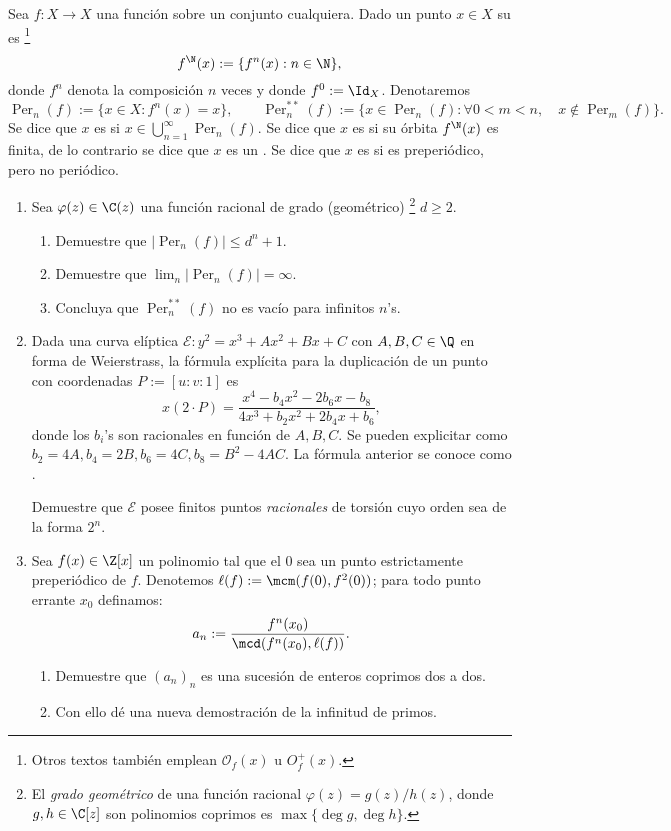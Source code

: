 \documentclass[11pt, reqno]{amsart}
\DeclareMathOperator{\Per}{Per}
\begin{document}
\begin{mydef}
	Sea $f \colon X \to X$ una función sobre un conjunto cualquiera.
	Dado un punto $x \in X$ su  es%
	\footnote{Otros textos también emplean $\mathcal{O}_f(x)$ u $O_f^+(x)$.}
	\[
		f^\N(x) := \{ f^n(x) : n \in \N \},
	\]
	donde $f^n$ denota la composición $n$ veces y donde $f^0 := \Id_X$.
	Denotaremos
	$$ \Per_n(f) := \{ x \in X : f^n(x) = x \}, \qquad \Per_n^{**}(f) := \{ x \in \Per_n(f) : \forall 0 < m < n, \quad x \notin \Per_m(f) \}. $$
	Se dice que $x$ es  si $x \in \bigcup_{n=1}^\infty \Per_n(f)$.
	Se dice que $x$ es  si su órbita $f^\N(x)$ es finita, de lo contrario se dice que $x$ es un .
	Se dice que $x$ es  si es preperiódico, pero no periódico.
\end{mydef}
\begin{enumerate}[resume]
	\item Sea $\varphi(z) \in \C(z)$ una función racional de grado (geométrico)%
		\footnote{El \textit{grado geométrico} de una función racional $\varphi(z) = g(z)/h(z)$, donde $g, h \in \C[z]$ son polinomios coprimos
		es $\max\{ \deg g, \deg h \}$.}
		$d \ge 2$.
		\begin{enumerate}
			\item Demuestre que $|\Per_n(f)| \le d^n + 1$.
			\item Demuestre que $\lim_n |\Per_n(f)| = \infty$.
			\item Concluya que $\Per_n^{**}(f)$ no es vacío para infinitos $n$'s.
		\end{enumerate}

	\item Dada una curva elíptica $\mathcal{E} \colon y^2 = x^3 + Ax^2 + Bx + C$ con $A,B,C \in \Q$ en forma de Weierstrass,
		la fórmula explícita para la duplicación de un punto con coordenadas $P := [u : v : 1]$ es
		$$ x(2\cdot P) = \frac{x^4 - b_4x^2 - 2b_6 x - b_8}{4x^3 + b_2x^2 + 2b_4x + b_6}, $$
		donde los $b_i$'s son racionales en función de $A, B, C$.
		Se pueden explicitar como $b_2 = 4A, b_4 = 2B, b_6 = 4C, b_8 = B^2 - 4AC$.
		La fórmula anterior se conoce como .

		Demuestre que $\mathcal{E}$ posee finitos puntos \textit{racionales} de torsión cuyo orden sea de la forma $2^n$.

	\item Sea $f(x) \in \Z[x]$ un polinomio tal que el 0 sea un punto estrictamente preperiódico de $f$.
		Denotemos $\ell(f) := \mcm(f(0), f^2(0))$; para todo punto errante $x_0$ definamos:
		$$ a_n := \frac{f^n(x_0)}{\mcd( f^n(x_0), \ell(f) )}. $$
		\begin{enumerate}
			\item \hard
				Demuestre que $(a_n)_n$ es una sucesión de enteros coprimos dos a dos.
			\item Con ello dé una nueva demostración de la infinitud de primos.
		\end{enumerate}
\end{enumerate}
\end{document}
